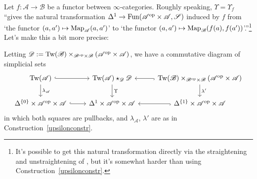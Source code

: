 \documentclass{tac}
\newcommand{\s}[1]{\mathscr{#1}}
\newcommand{\tx}[1]{\textnormal{#1}}
\begin{document}
\begin{rmk}\label{upsilonunwindrmk} Let $f:\s{A}\to \s{B}$ be a functor between $\infty$-categories.  Roughly speaking, $\Upsilon = \Upsilon_f$ ``gives the natural transformation $\Delta^1 \to \tx{Fun}(\s{A}^\tx{op} \times \s{A}, \s{S}) $ induced by $f$ from `the functor $(a,a') \mapsto \tx{Map}_\s{A} (a,a')$' to `the functor $(a,a') \mapsto \tx{Map}_{\s{B}} (f(a), f(a'))$'.''\footnote{It's possible to get this natural transformation directly via the straightening and unstraightening of \cite{htt}, but it's somewhat harder than using Construction~\ref{upsilonconstr}.}  Let's make this a bit more precise:

\hfill

Letting $\s{D}:=\tx{Tw}(\s{B}) \times_{\s{B}^\tx{op} \times \s{B}} (\s{A}^\tx{op}\times \s{A})$, we have a commutative diagram of simplicial sets
\[\begin{tikzcd}
\tx{Tw}(\s{A}) \arrow[hook]{r} \arrow[]{d}{\lambda_\s{A}} & \tx{Tw}(\s{A}) \star_{\s{D}} \s{D} \arrow[]{d}{\Upsilon} & \tx{Tw}(\s{B}) \times_{\s{B}^\tx{op} \times \s{B}} (\s{A}^\tx{op}\times \s{A}) \arrow[hook]{l} \arrow[]{d}{\lambda'} \\ 
\Delta^{\{0\}} \times \s{A}^\tx{op}\times \s{A} \arrow[hook]{r} & \Delta^{1} \times \s{A}^\tx{op}\times \s{A} & \Delta^{\{1\}} \times \s{A}^\tx{op}\times \s{A} \arrow[hook]{l}
\end{tikzcd}\]
in which both squares are pullbacks, and $\lambda_{\s{A}}$, $\lambda'$ are as in Construction~\ref{upsilonconstr}. 


\end{rmk}
\end{document}
